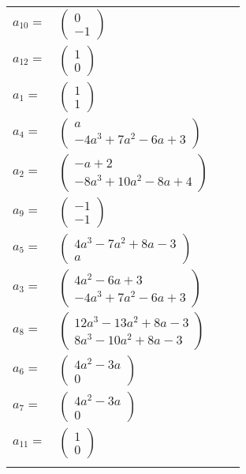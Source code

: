 \documentclass[1p]{elsarticle_modified}
\theoremstyle{definition}
\begin{document}
\begin{tabular}{m{7pt} m{180pt} m{7pt} m{180pt} }
\flushright $a_{10}=$&$\begin{pmatrix}0\\-1\end{pmatrix}$ \\
\flushright $a_{12}=$&$\begin{pmatrix}1\\0\end{pmatrix}$ \\
\flushright $a_{1}=$&$\begin{pmatrix}1\\1\end{pmatrix}$ \\
\flushright $a_{4}=$&$\begin{pmatrix}a\\-4 a^3+7 a^2-6 a+3\end{pmatrix}$ \\
\flushright $a_{2}=$&$\begin{pmatrix}- a+2\\-8 a^3+10 a^2-8 a+4\end{pmatrix}$ \\
\flushright $a_{9}=$&$\begin{pmatrix}-1\\-1\end{pmatrix}$ \\
\flushright $a_{5}=$&$\begin{pmatrix}4 a^3-7 a^2+8 a-3\\a\end{pmatrix}$ \\
\flushright $a_{3}=$&$\begin{pmatrix}4 a^2-6 a+3\\-4 a^3+7 a^2-6 a+3\end{pmatrix}$ \\
\flushright $a_{8}=$&$\begin{pmatrix}12 a^3-13 a^2+8 a-3\\8 a^3-10 a^2+8 a-3\end{pmatrix}$ \\
\flushright $a_{6}=$&$\begin{pmatrix}4 a^2-3 a\\0\end{pmatrix}$ \\
\flushright $a_{7}=$&$\begin{pmatrix}4 a^2-3 a\\0\end{pmatrix}$ \\
\flushright $a_{11}=$&$\begin{pmatrix}1\\0\end{pmatrix}$\\&\end{tabular}
\end{document}

